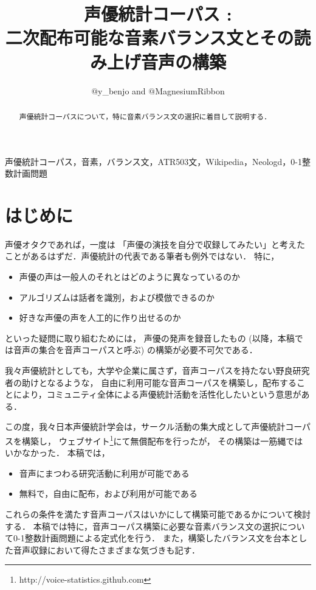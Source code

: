 \documentclass[final,10pt,twocolumn,3p,times,fleqn]{elsarticle}
\begin{document}
\begin{frontmatter}

\title{声優統計コーパス : \\二次配布可能な音素バランス文とその読み上げ音声の構築}

\author{$@$y\_benjo and $@$MagnesiumRibbon}

\address{}

   \begin{abstract}
    声優統計コーパスについて，特に音素バランス文の選択に着目して説明する．
   \end{abstract}

\begin{keyword}
 声優統計コーパス，音素，バランス文，ATR503文，Wikipedia，Neologd，0-1整数計画問題
\end{keyword}

\end{frontmatter}


 \section{はじめに}\label{sec_intro}
 声優オタクであれば，一度は 「声優の演技を自分で収録してみたい」と考えたことがあるはずだ．声優統計の代表である筆者も例外ではない．
 特に，
 \begin{itemize}
  \item 声優の声は一般人のそれとはどのように異なっているのか
  \item アルゴリズムは話者を識別，および模倣できるのか
  \item 好きな声優の声を人工的に作り出せるのか
 \end{itemize}
 といった疑問に取り組むためには，
 声優の発声を録音したもの (以降，本稿では音声の集合を音声コーパスと呼ぶ) の構築が必要不可欠である．

 我々声優統計としても，大学や企業に属さず，音声コーパスを持たない野良研究者の助けとなるような，
 自由に利用可能な音声コーパスを構築し，配布することにより，コミュニティ全体による声優統計活動を活性化したいという意思がある．

 
 この度，我々日本声優統計学会は，サークル活動の集大成として声優統計コーパスを構築し，
 ウェブサイト\footnote{http://voice-statistics.github.com}にて無償配布を行ったが，
 その構築は一筋縄ではいかなかった． 本稿では，
 \begin{itemize}
  \item 音声にまつわる研究活動に利用が可能である
  \item 無料で，自由に配布，および利用が可能である
 \end{itemize}
 これらの条件を満たす音声コーパスはいかにして構築可能であるかについて検討する．
 本稿では特に，音声コーパス構築に必要な音素バランス文の選択について0-1整数計画問題による定式化を行う．
 また，構築したバランス文を台本とした音声収録において得たさまざまな気づきも記す．
\end{document}

